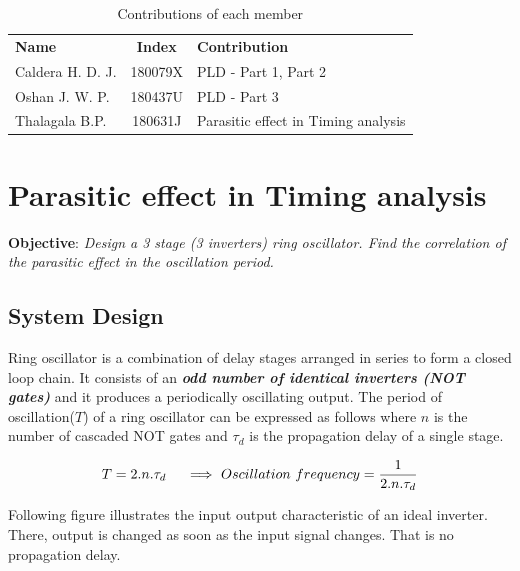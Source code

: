 \documentclass[a4paper,11pt]{article}%
\begin{document}


\tableofcontents
\vspace{4cm}
\begin{table}[H]
		\centering
		\begin{tabular}{l c l}
		\textbf{Name} & \textbf{Index} & \textbf{Contribution}\\

	Caldera H. D. J. &  180079X& PLD - Part 1, Part 2\\
	Oshan J. W. P.    & 180437U& PLD - Part 3 \\
	Thalagala B.P. & 180631J & Parasitic effect in Timing analysis \\


		\end{tabular}
		\caption{Contributions of each member}
\end{table}




\pagebreak
\section{Parasitic effect in Timing analysis}
\textbf{Objective}: \textit{Design a 3 stage (3 inverters) ring oscillator. Find the correlation of the parasitic effect in the oscillation period.}\\

\subsection{System Design}
Ring oscillator is a combination of delay stages arranged in series to form a closed loop chain. It consists of an \textbf{\textit{odd number of identical inverters (NOT gates)}} and it produces a  periodically oscillating output. The period of oscillation($T$) of a ring oscillator can be expressed as follows where $n$ is the number of cascaded NOT gates and $\tau_{d}$ is the propagation delay of a single stage\cite{rosci}.

\[
T = 2.n.\tau_{d} \hspace{5mm}\Longrightarrow ~ Oscillation~frequency = \frac{1}{2.n.\tau_{d}}
\]
\vspace{5mm}

Following figure illustrates the input output characteristic of an ideal inverter. There, output is changed as soon as the input signal changes. That is no propagation delay.
\end{document}

